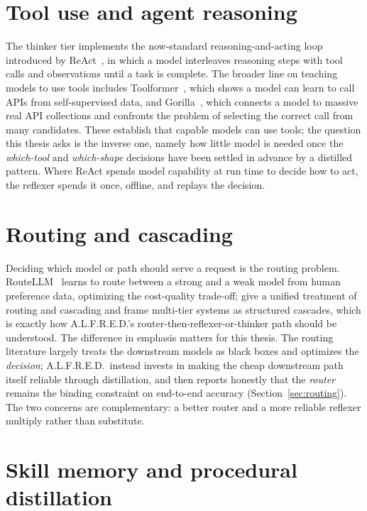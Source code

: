 \section{Tool use and agent reasoning}
\label{sec:bg-agents}

The thinker tier implements the now-standard reasoning-and-acting loop introduced
by ReAct~\citep{yao2022react}, in which a model interleaves reasoning steps with
tool calls and observations until a task is complete. The broader line on teaching
models to use tools includes Toolformer~\citep{schick2023toolformer}, which shows a
model can learn to call APIs from self-supervised data, and
Gorilla~\citep{patil2023gorilla}, which connects a model to massive real API
collections and confronts the problem of selecting the correct call from many
candidates. These establish that capable models can use tools; the question this
thesis asks is the inverse one, namely how little model is needed once the
\emph{which-tool} and \emph{which-shape} decisions have been settled in advance by
a distilled pattern. Where ReAct spends model capability at run time to decide how
to act, the reflexer spends it once, offline, and replays the decision.

\section{Routing and cascading}
\label{sec:bg-routing}

Deciding which model or path should serve a request is the routing problem.
RouteLLM~\citep{ong2024routellm} learns to route between a strong and a weak model
from human preference data, optimizing the cost-quality trade-off;
\citet{dekoninck2024unifiedrouting} give a unified treatment of routing and
cascading and frame multi-tier systems as structured cascades, which is exactly
how A.L.F.R.E.D.'s router-then-reflexer-or-thinker path should be understood. The
difference in emphasis matters for this thesis. The routing literature largely
treats the downstream models as black boxes and optimizes the \emph{decision};
A.L.F.R.E.D.\ instead invests in making the cheap downstream path itself reliable
through distillation, and then reports honestly that the \emph{router} remains the
binding constraint on end-to-end accuracy (Section~\ref{sec:routing}). The two
concerns are complementary: a better router and a more reliable reflexer multiply
rather than substitute.

\section{Skill memory and procedural distillation}
\label{sec:bg-skills}

